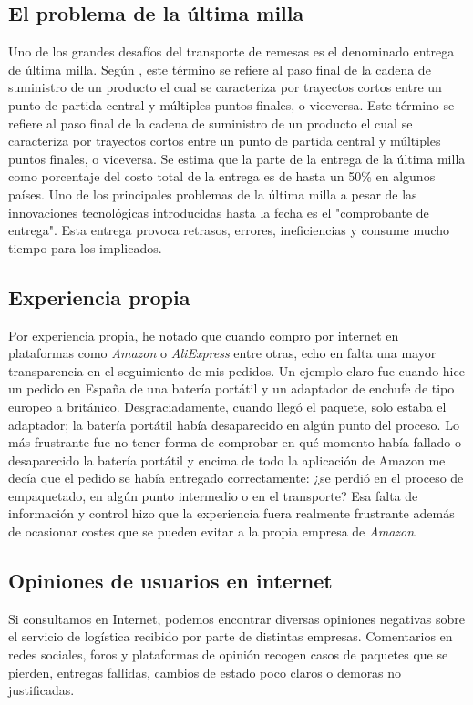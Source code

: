 \subsection{El problema de la última milla}
Uno de los grandes desafíos del transporte de remesas es el denominado entrega de última milla.
Según \textcite{problemaUltimaMilla}, este término se refiere al paso final de la cadena de suministro de un producto el cual se caracteriza por trayectos cortos entre un punto de partida central y múltiples puntos finales, o viceversa.
Este término se refiere al paso final de la cadena de suministro de un producto el cual se caracteriza por trayectos cortos entre un punto de partida central y múltiples puntos finales, o viceversa.
Se estima que la parte de la entrega de la última milla como porcentaje del costo total de la entrega es de hasta un 50\% en algunos países.
Uno de los principales problemas de la última milla a pesar de las innovaciones tecnológicas introducidas hasta la fecha es el "comprobante de entrega". Esta entrega provoca retrasos, errores, ineficiencias y consume mucho tiempo para los implicados.  


\subsection{Experiencia propia}
Por experiencia propia, he notado que cuando compro por internet en plataformas como \textit{Amazon} o \textit{AliExpress} entre otras,
echo en falta una mayor transparencia en el seguimiento de mis pedidos. Un ejemplo claro fue cuando hice un pedido en España de una batería portátil y un adaptador
de enchufe de tipo europeo a británico. Desgraciadamente, cuando llegó el paquete, solo estaba el adaptador; la batería portátil había 
desaparecido en algún punto del proceso. Lo más frustrante fue no tener forma de comprobar en qué momento había fallado o desaparecido la batería portátil y encima de todo
la aplicación de Amazon me decía que el pedido se había entregado correctamente: ¿se perdió en el proceso de empaquetado, en algún punto intermedio o en el transporte?
Esa falta de información y control hizo que la experiencia fuera realmente frustrante además de ocasionar costes que se pueden evitar a la propia empresa de \textit{Amazon}.

\subsection{Opiniones de usuarios en internet}
Si consultamos en Internet, podemos encontrar diversas opiniones negativas sobre el servicio de logística recibido por parte de distintas empresas. Comentarios en redes sociales, foros y plataformas de opinión recogen casos de paquetes que se pierden, entregas fallidas, cambios de estado poco claros o demoras no justificadas.

